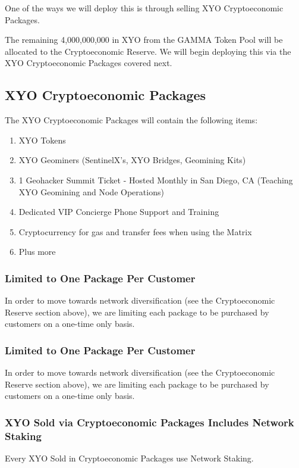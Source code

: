 \documentclass{article}
\begin{document}
One of the ways we will deploy this is through selling XYO Cryptoeconomic Packages.

The remaining 4,000,000,000 in XYO from the GAMMA Token Pool will be allocated to the Cryptoeconomic Reserve. We will begin deploying this via the XYO Cryptoeconomic Packages covered next.

\subsection{XYO Cryptoeconomic Packages}

The XYO Cryptoeconomic Packages will contain the following items:

\begin{enumerate}
  \item XYO Tokens
  \item XYO Geominers (SentinelX's, XYO Bridges, Geomining Kits)
  \item 1 Geohacker Summit Ticket - Hosted Monthly in San Diego, CA (Teaching XYO Geomining and Node Operations)
  \item Dedicated VIP Concierge Phone Support and Training
  \item Cryptocurrency for gas and transfer fees when using the Matrix
  \item Plus more
\end{enumerate}

\subsubsection{Limited to One Package Per Customer}
In order to move towards network diversification (see the Cryptoeconomic Reserve section above), we are limiting each package to be purchased by customers on a one-time only basis.

\subsubsection{Limited to One Package Per Customer}
In order to move towards network diversification (see the Cryptoeconomic Reserve section above), we are limiting each package to be purchased by customers on a one-time only basis.

\subsubsection{XYO Sold via Cryptoeconomic Packages Includes Network Staking}

Every XYO Sold in Cryptoeconomic Packages use Network Staking.
\end{document}

